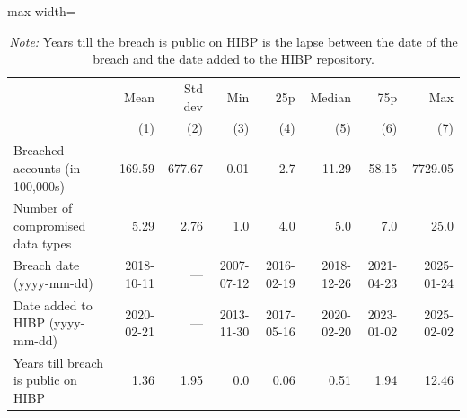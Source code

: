 \documentclass[12pt, letterpaper]{article}
\begin{document}
\begin{table}[ht] 
\centering 
\small 
\setlength\tabcolsep{6 pt} 
\setlength{\defaultaddspace}{0pt}
\def\sym#1{\ifmmode^{#1}\else\(^{#1}\)\fi}
\caption{Summary of HIBP breaches ($n = 857$)}
\label{tab:hibp_breach_summary}
\begin{adjustbox}{max width=\textwidth}
\begin{tabular}{@{\hspace{0\tabcolsep}}l*{7}{r}@{\hspace{0\tabcolsep}}}
    \toprule\toprule
    &Mean&Std dev & Min & 25p & Median & 75p & Max\\
    &\multicolumn{1}{r}{(1)}         &\multicolumn{1}{r}{(2)}         &\multicolumn{1}{r}{(3)}         &\multicolumn{1}{r}{(4)}         &\multicolumn{1}{r}{(5)}         &\multicolumn{1}{r}{(6)}         &\multicolumn{1}{r}{(7)}\\
    \midrule
    Breached accounts (in 100,000s) & 169.59 & 677.67 & 0.01 & 2.7 & 11.29 & 58.15 & 7729.05 \\
    Number of compromised data types & 5.29 & 2.76 & 1.0 & 4.0 & 5.0 & 7.0 & 25.0 \\
    Breach date (yyyy-mm-dd) & 2018-10-11 & --- & 2007-07-12 & 2016-02-19 & 2018-12-26 & 2021-04-23 & 2025-01-24 \\
    Date added to HIBP (yyyy-mm-dd) & 2020-02-21 & --- & 2013-11-30 & 2017-05-16 & 2020-02-20 & 2023-01-02 & 2025-02-02 \\
    Years till breach is public on HIBP & 1.36 & 1.95 & 0.0 & 0.06 & 0.51 & 1.94 & 12.46 \\
    \bottomrule
\end{tabular}
\end{adjustbox}
\caption*{\footnotesize 
    \textit{Note:} Years till the breach is public on HIBP is the lapse between the date of the breach and the date added to the HIBP repository.
}
\end{table}

\clearpage
\newpage
\end{document}
